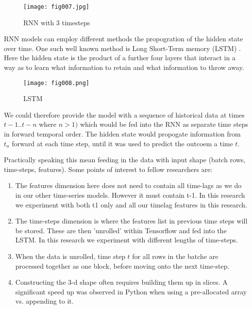 \begin{figure}[h!]
	\centering
	\texttt{[image: fig007.jpg]}
	\caption{RNN with 3 timesteps}
	\label{RNN}
\end{figure} 

RNN models can employ different methods the propogration of the hidden state over time. One such well known method is Long Short-Term memory (LSTM) \parencite{Olah}. Here the hidden state is the product of a further four layers that interact in a way as to learn what information to retain and what information to throw away. 

\begin{figure}[h!]
	\centering
	\texttt{[image: fig008.png]}
	\caption{LSTM}
	\label{fig:fig8}
\end{figure} 


We could therefore provide the model with a sequence of historical data at times $t-1 .. t-n$ where $n >1)$ which would be fed into the RNN as separate time steps in forward temporal order. The hidden state would propogate information from $t_n$ forward at each time step, until it was used to predict the outcoem a time $t$.

Practically speaking this mean feeding in the data with input shape (batch rows, time-steps, features). Some points of interest to fellow researchers are:

\begin{enumerate}
	\item The features dimension here does not need to contain all time-lags as we do in our other time-series models. However it must contain t-1. In this research we experiment with both t1 only and all our timelag features in this research.
		
	\item The time-steps dimension is where the features list in previous time steps will be stored. These are then 'unrolled' within Tensorflow and fed into the LSTM. In this research we experiment with different lengths of time-steps.

	\item When the data is unrolled, time step $t$ for all rows in the batche are processed together as one block, before moving onto the next time-step.

	\item Constructing the 3-d shape often requires building them up in slices. A significant speed up was observed in Python when using a pre-allocated array vs. appending to it.
\end{enumerate}

